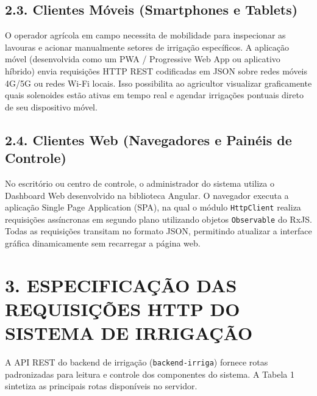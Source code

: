 \subsection*{2.3. Clientes Móveis (Smartphones e Tablets)}

O operador agrícola em campo necessita de mobilidade para inspecionar as lavouras e acionar manualmente setores de irrigação específicos. A aplicação móvel (desenvolvida como um PWA / Progressive Web App ou aplicativo híbrido) envia requisições HTTP REST codificadas em JSON sobre redes móveis 4G/5G ou redes Wi-Fi locais. Isso possibilita ao agricultor visualizar graficamente quais solenoides estão ativas em tempo real e agendar irrigações pontuais direto de seu dispositivo móvel.

\subsection*{2.4. Clientes Web (Navegadores e Painéis de Controle)}

No escritório ou centro de controle, o administrador do sistema utiliza o Dashboard Web desenvolvido na biblioteca Angular. O navegador executa a aplicação Single Page Application (SPA), na qual o módulo \texttt{HttpClient} realiza requisições assíncronas em segundo plano utilizando objetos \texttt{Observable} do RxJS. Todas as requisições transitam no formato JSON, permitindo atualizar a interface gráfica dinamicamente sem recarregar a página web.

\newpage

\section*{3. ESPECIFICAÇÃO DAS REQUISIÇÕES HTTP DO SISTEMA DE IRRIGAÇÃO}

A API REST do backend de irrigação (\texttt{backend-irriga}) fornece rotas padronizadas para leitura e controle dos componentes do sistema. A Tabela 1 sintetiza as principais rotas disponíveis no servidor.

